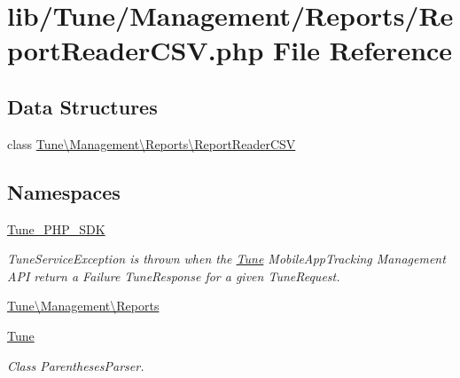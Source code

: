 \hypertarget{ReportReaderCSV_8php}{\section{lib/\-Tune/\-Management/\-Reports/\-Report\-Reader\-C\-S\-V.php File Reference}
\label{ReportReaderCSV_8php}
}
\subsection*{Data Structures}
\begin{DoxyCompactItemize}
\item 
class \hyperlink{classTune_1_1Management_1_1Reports_1_1ReportReaderCSV}{Tune\textbackslash{}\-Management\textbackslash{}\-Reports\textbackslash{}\-Report\-Reader\-C\-S\-V}
\end{DoxyCompactItemize}
\subsection*{Namespaces}
\begin{DoxyCompactItemize}
\item 
\hyperlink{namespaceTune__PHP__SDK}{Tune\-\_\-\-P\-H\-P\-\_\-\-S\-D\-K}
\begin{DoxyCompactList}\small\item\em Tune\-Service\-Exception is thrown when the \hyperlink{namespaceTune}{Tune} Mobile\-App\-Tracking Management A\-P\-I return a Failure Tune\-Response for a given Tune\-Request. \end{DoxyCompactList}\item 
\hyperlink{namespaceTune_1_1Management_1_1Reports}{Tune\textbackslash{}\-Management\textbackslash{}\-Reports}
\item 
\hyperlink{namespaceTune}{Tune}
\begin{DoxyCompactList}\small\item\em Class Parentheses\-Parser. \end{DoxyCompactList}\end{DoxyCompactItemize}
